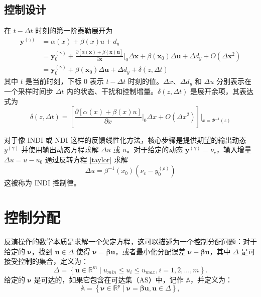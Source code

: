\begin{ubox}
  \subsection{控制设计}
  在 $t - \Delta t$ 时刻的第一阶泰勒展开为
  \begin{equation}
	\begin{aligned}
	\bm{y}^{(\gamma)}& =\alpha(x)+\beta (x)u + d_y\\
	&=\bm{y}_{0}^{(\gamma)}+\frac{\partial[\alpha(\bm{x})+\mathcal{\beta}(\bm{x})\bm{u}]}{\partial\bm{x}}\Bigg|_{0}\Delta\bm{x}+\mathcal{\beta}(\bm{x}_{0})\Delta\bm{u} + \Delta d_y +O(\Delta\bm{x}^{2})\\
	&=\bm{y}_{0}^{(\gamma)}+\mathcal{\beta}(\bm{x}_{0})\Delta\bm{u}+ \Delta d_y +\delta(z,\Delta t)
	\end{aligned}
  \label{taylor}
  \end{equation}
  其中 $t$ 是当前时刻，下标 0 表示 $t - \Delta t$ 时刻的值。$\Delta x$、$\Delta d_y$ 和 $\Delta u$ 分别表示在一个采样时间步 $\Delta t$ 内的状态、干扰和控制增量。$\delta(z,\Delta t)$ 是展开余项，其表达式为
  \begin{equation}
	\delta(z,\Delta t)=\left[\frac{\partial[\alpha(x)+\beta (x)u]}{\partial x}\Bigg|_{0}\Delta x+O(\Delta x^{2})\right]\Bigg|_{x=\Phi^{-1}(z)}
  \end{equation}
  
  对于像 INDI 或 NDI 这样的反馈线性化方法，核心步骤是提供期望的输出动态 $y^{(\gamma)}$ 并使用输出动态方程求解 $ \Delta u $ 或 $ u $。对于给定的动态 $\bm{y}^{(\gamma)}=\nu_c$，输入增量 $\Delta u=u-u_0$ 通过反转方程 \eqref{taylor} 求解
  \begin{equation}
	\Delta u=\beta ^{-1}(x_{0})(\nu_c-y_{0}^{(\rho)})
	\label{indi}
  \end{equation}
  这被称为 INDI 控制律。
  
  \section{控制分配}
  反演操作的数学本质是求解一个欠定方程，这可以描述为一个控制分配问题：对于给定的 ${{\bm{\nu }}}$，找到 ${{\bm{u }}}\in \Delta $ 使得 ${{\bm{\nu }}}=\bm{\beta}\bm{u}$，或者最小化分配误差 ${{\bm{\nu }}}-\bm{\beta}\bm{u}$，其中 $\Delta $ 是可接受控制的集合，定义为：
  \begin{equation}
  \Delta=\left\{\bm{u} \in \mathbb{R}^{m} \mid u_{min} \leq u_{i} \leq u_{max}, i= 1, 2, ..., m\right\}.
  \label{eq_30}
  \end{equation}
  给定的 ${{\bm{\nu }}}$ 是可达的，如果它包含在可达集（AS）中，记作 $\mathbb{A} $，并定义为：
  \begin{equation}
  \mathbb{A} =\left\{\bm{\nu} \in \mathbb{R}^{p} \mid \bm{\nu}=\bm{\beta} \bm{u}, \bm{u} \in \Delta\right\},
  \label{eq_31}
  \end{equation}
  

\end{ubox}
